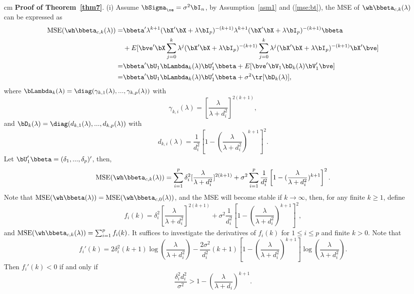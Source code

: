 {{	 cm
{\bf Proof of Theorem~\ref{thm7}}. (i)	Assume $\bSigma_\ve=\sigma^2\bI_n$,	by Assumption~\ref{asm1} and (\ref{mse:bt}), the MSE of $\wh\bbeta_{c,k}(\lambda)$ can be expressed as
\begin{align}\label{mse:beck:i}
    \text{MSE}(\wh\bbeta_{c,k}(\lambda))=&\bbeta'\lambda^{k+1}(\bX'\bX+\lambda\bI_p)^{-(k+1)}\lambda^{k+1}(\bX'\bX+\lambda\bI_p)^{-(k+1)}\bbeta\notag\\
    &+E[\bve'\bX\sum_{j=0}^k\lambda^j(\bX'\bX+\lambda\bI_p)^{-(k+1)}\sum_{j=0}^k\lambda^j(\bX'\bX+\lambda\bI_p)^{-(k+1)}\bX'\bve]\notag\\
    =&\bbeta'\bU_1\bLambda_{k}(\lambda)\bU_1'\bbeta+E[\bve'\bV_1\bD_{k}(\lambda)\bV_1'\bve]\notag\\
    =&\bbeta'\bU_1\bLambda_{k}(\lambda)\bU_1'\bbeta+\sigma^2\tr[\bD_{k}(\lambda)],
\end{align}
		where $\bLambda_{k}(\lambda)=\diag(\gamma_{k,1}(\lambda),...,\gamma_{k,p}(\lambda))$ with
\[\gamma_{k,i}(\lambda)=[\frac{\lambda}{\lambda+d_i^2}]^{2(k+1)},\]
and $\bD_{k}(\lambda)=\diag(d_{k,1}(\lambda),...,d_{k,p}(\lambda))$ with
\[d_{k,i}(\lambda)=\frac{1}{d_i^2}\left[1-(\frac{\lambda}{\lambda+d_i^2})^{k+1}\right]^2.\]
Let $\bU_1'\bbeta=(\delta_1,...,\delta_p)'$, then, 	
\begin{equation}\label{mse:btck:final}
    \text{MSE}(\wh\bbeta_{c,k}(\lambda))=\sum_{i=1}^p\delta_i^2[\frac{\lambda}{\lambda+d_i^2}]^{2(k+1)}+\sigma^2\sum_{i=1}^p\frac{1}{d_i^2}\left[1-(\frac{\lambda}{\lambda+d_i^2})^{k+1}\right]^2.
\end{equation}
Note that $\text{MSE}(\wh\bbeta(\lambda))=\text{MSE}(\wh\bbeta_{c,0}(\lambda))$, and the MSE will become stable if $k\rightarrow\infty$, then, for any finite $k\geq 1$, define 
\[f_i(k)=\delta_i^2[\frac{\lambda}{\lambda+d_i^2}]^{2(k+1)}+\sigma^2\frac{1}{d_i^2}\left[1-(\frac{\lambda}{\lambda+d_i^2})^{k+1}\right]^2,\]
and $\text{MSE}(\wh\bbeta_{c,k}(\lambda))=\sum_{i=1}^pf_i(k)$. It suffices to investigate the derivatives of $f_{i}(k)$ for $1\leq i\leq p$ and finite $k>0$. Note that
\begin{equation}\label{fip}
    f_i'(k)=2\delta_i^2(k+1)\log(\frac{\lambda}{\lambda+d_i^2})-\frac{2\sigma^2}{d_i^2}(k+1)[1-(\frac{\lambda}{\lambda+d_i^2})^{k+1}]\log(\frac{\lambda}{\lambda+d_i^2}).
\end{equation}
  Then $f_i'(k)<0$ if and only if
\begin{equation}\label{cond:iff}
    \frac{\delta_i^2d_i^2}{\sigma^2}>1-(\frac{\lambda}{\lambda+d_i})^{k+1}.
\end{equation}
}}
